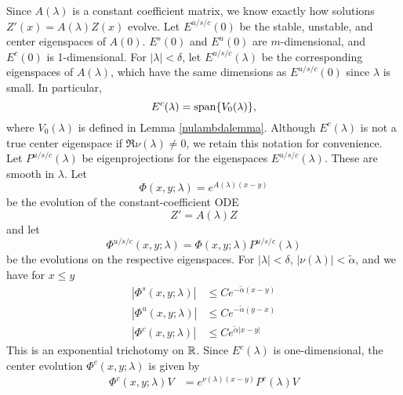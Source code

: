 \documentclass[thesis.tex]{subfiles}
\begin{document}
Since $A(\lambda)$ is a constant coefficient matrix, we know exactly how solutions $Z'(x) = A(\lambda)Z(x)$ evolve. Let $E^{u/s/c}(0)$ be the stable, unstable, and center eigenspaces of $A(0)$. $E^s(0)$ and $E^u(0)$ are $m$-dimensional, and $E^c(0)$ is 1-dimensional. For $|\lambda| < \delta$, let $E^{u/s/c}(\lambda)$ be the corresponding eigenspaces of $A(\lambda)$, which have the same dimensions as $E^{u/s/c}(0)$ since $\lambda$ is small. In particular, 
\[
E^c(\lambda) = \operatorname{span}\{ V_0(\lambda) \},
\]
where $V_0(\lambda)$ is defined in Lemma \ref{nulambdalemma}. Although $E^c(\lambda)$ is not a true center eigenspace if $\Re \nu(\lambda) \neq 0$, we retain this notation for convenience. Let $P^{u/s/c}(\lambda)$ be eigenprojections for the eigenspaces $E^{u/s/c}(\lambda)$. These are smooth in $\lambda$. Let
\begin{equation}
\Phi(x, y; \lambda) = e^{A(\lambda)(x-y)}
\end{equation}
be the evolution of the constant-coefficient ODE
\begin{equation}\label{constcoeffZ}
Z' = A(\lambda) Z
\end{equation}
and let 
\begin{equation}\label{Zevoltri}
\Phi^{u/s/c}(x, y; \lambda) = \Phi(x, y; \lambda)P^{u/s/c}(\lambda)
\end{equation}
be the evolutions on the respective eigenspaces. For $|\lambda| < \delta$, $|\nu(\lambda)| < \tilde{\alpha}$, and we have for $x \leq y$
\begin{equation}\label{Zevolbounds}
\begin{aligned}
|\Phi^s(x, y; \lambda)| &\leq C e^{-\tilde{\alpha}(x - y)} \\
|\Phi^u(x, y; \lambda)| &\leq C e^{-\tilde{\alpha}(y - x)} \\
|\Phi^c(x, y; \lambda)| &\leq C e^{\tilde{\alpha}|x - y|} 
\end{aligned}
\end{equation}
This is an exponential trichotomy on $\mathbb{R}$. Since $E^c(\lambda)$ is one-dimensional, the center evolution $\Phi^c(x, y; \lambda)$ is given by
\begin{align}\label{centerevol}
\Phi^c(x, y; \lambda) V &= e^{\nu(\lambda)(x - y)} P^c(\lambda)V
\end{align}
\end{document}
